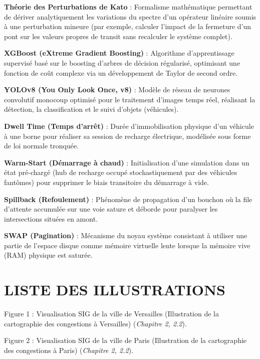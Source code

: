 \documentclass[10pt, a4paper]{article}
\begin{document}
\textbf{Théorie des Perturbations de Kato} : Formalisme mathématique
permettant de dériver analytiquement les variations du spectre d'un
opérateur linéaire soumis à une perturbation mineure (par exemple,
calculer l'impact de la fermeture d'un pont sur les valeurs propres de
transit sans recalculer le système complet).

\textbf{XGBoost (eXtreme Gradient Boosting)} : Algorithme
d'apprentissage supervisé basé sur le boosting d'arbres de décision
régularisé, optimisant une fonction de coût complexe via un
développement de Taylor de second ordre.

\textbf{YOLOv8 (You Only Look Once, v8)} : Modèle de réseau de neurones
convolutif monocoup optimisé pour le traitement d'images temps réel,
réalisant la détection, la classification et le suivi d'objets
(véhicules).

\textbf{Dwell Time (Temps d'arrêt)} : Durée d'immobilisation physique
d'un véhicule à une borne pour réaliser sa session de recharge
électrique, modélisée sous forme de loi normale tronquée.

\textbf{Warm-Start (Démarrage à chaud)} : Initialisation d'une
simulation dans un état pré-chargé (hub de recharge occupé
stochastiquement par des véhicules fantômes) pour supprimer le biais
transitoire du démarrage à vide.

\textbf{Spillback (Refoulement)} : Phénomène de propagation d'un bouchon
où la file d'attente accumulée sur une voie sature et déborde pour
paralyser les intersections situées en amont.

\textbf{SWAP (Pagination)} : Mécanisme du noyau système consistant à
utiliser une partie de l'espace disque comme mémoire virtuelle lente
lorsque la mémoire vive (RAM) physique est saturée.

\endgroup

\newpage

\section{LISTE DES ILLUSTRATIONS}\label{liste-des-illustrations}

\begingroup
\setlength{\parskip}{0.8em}

Figure 1 : Visualisation SIG de la ville de Versailles (Illustration de
la cartographie des congestions à Versailles) (\emph{Chapitre 2, 2.2}).

Figure 2 : Visualisation SIG de la ville de Paris (Illustration de la
cartographie des congestions à Paris) (\emph{Chapitre 2, 2.2}).
\end{document}

